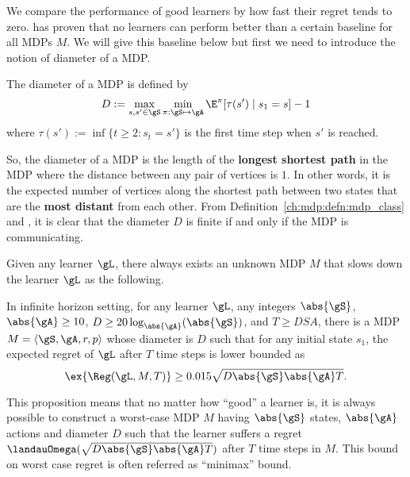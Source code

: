 We compare the performance of good learners by how fast their regret tends to zero.
\cite{jaksch2010near} has proven that no learners can perform better than a certain baseline for all MDPs $M$.
We will give this baseline below but first we need to introduce the notion of diameter of a MDP.
\begin{defn}
    The diameter of a MDP is defined by
    \begin{equation}
        \label{eq:diameter}
        D := \max_{s,s'\in\gS}\min_{\pi:\gS\mapsto\gA} \E^\pi[\tau(s') \mid s_1=s] -1
    \end{equation}
    where $\tau(s'):=\inf\{t\ge2 : s_t=s'\}$ is the first time step when $s'$ is reached.
    \label{ch:rl:defn:diameter}
\end{defn}
So, the diameter of a MDP is the length of the \textbf{longest shortest path} in the MDP where the distance between any pair of vertices is $1$.
In other words, it is the expected number of vertices along the shortest path between two states that are the \textbf{most distant} from each other.
From Definition~\ref{ch:mdp:defn:mdp_class} and \cite[Proposition~8.3.1]{puterman2014markov}, it is clear that the diameter $D$ is finite if and only if the MDP is communicating.

Given any learner $\gL$, there always exists an unknown MDP $M$ that slows down the learner $\gL$ as the following.
\begin{prop}
    \label{prop:minimax_rg_lb}
    In infinite horizon setting, for any learner $\gL$, any integers $\abs{\gS}$, $\abs{\gA}\ge10$, $D\ge 20\log_{\abs{\gA}}(\abs{\gS})$, and $T\ge DSA$, there is a MDP $M=\langle\gS,\gA,r,p\rangle$ whose diameter is $D$ such that for any initial state $s_1$, the expected regret of $\gL$ after $T$ time steps is lower bounded as
    \begin{equation}
        \label{eq:minimax_rg_lb}
        \ex{\Reg(\gL, M, T)} \ge 0.015\sqrt{D\abs{\gS}\abs{\gA}T}.
    \end{equation}
\end{prop}
This proposition means that no matter how ``good'' a learner is, it is always possible to construct a worst-case MDP $M$ having $\abs{\gS}$ states, $\abs{\gA}$ actions and diameter $D$ such that the learner suffers a regret $\landauOmega(\sqrt{D\abs{\gS}\abs{\gA}T})$ after $T$ time steps in $M$.
This bound on worst case regret is often referred as ``minimax'' bound.

